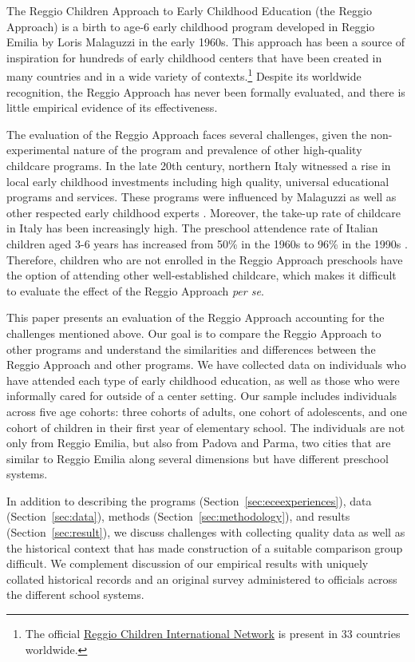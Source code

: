 
The Reggio Children Approach to Early Childhood Education (the Reggio Approach) is a birth to age-6 early childhood program developed in Reggio Emilia by Loris Malaguzzi in the early 1960s. This approach has been a source of inspiration for hundreds of early childhood centers that have been created in many countries and in a wide variety of contexts.\footnote{The official \href{http://www.reggiochildren.it/network/?lang=en}{Reggio Children International Network} is present in 33 countries worldwide.} Despite its worldwide recognition, the Reggio Approach has never been formally evaluated, and there is little empirical evidence of its effectiveness. 

The evaluation of the Reggio Approach faces several challenges, given the non-experimental nature of the program and prevalence of other high-quality childcare programs. In the late 20th century, northern Italy witnessed a rise in local early childhood investments including high quality, universal educational programs and services. These programs were influenced by Malaguzzi as well as other respected early childhood experts \citep{OECD_2001_Italy-Country-Note}. Moreover, the take-up rate of childcare in Italy has been increasingly high. The preschool attendence rate of Italian children aged 3-6 years has increased from 50\% in the 1960s to 96\% in the 1990s \citep{Hohnerlein_2015_Development-and-Diffusion}. Therefore, children who are not enrolled in the Reggio Approach preschools have the option of attending other well-established childcare, which makes it difficult to evaluate the effect of the Reggio Approach \textit{per se}. 

This paper presents an evaluation of the Reggio Approach accounting for the challenges mentioned above. Our goal is to compare the Reggio Approach to other programs and understand the similarities and differences between the Reggio Approach and other programs. We have collected data on individuals who have attended each type of early childhood education, as well as those who were informally cared for outside of a center setting. Our sample includes individuals across five age cohorts: three cohorts of adults, one cohort of adolescents, and one cohort of children in their first year of elementary school. The individuals are not only from Reggio Emilia, but also from Padova and Parma, two cities that are similar to Reggio Emilia along several dimensions but have different preschool systems.  

In addition to describing the programs (Section~\ref{sec:eceexperiences}), data (Section~\ref{sec:data}), methods (Section~\ref{sec:methodology}), and results (Section~\ref{sec:result}), we discuss challenges with collecting quality data as well as the historical context that has made construction of a suitable comparison group difficult. We complement discussion of our empirical results with uniquely collated historical records and an original survey administered to officials across the different school systems.

